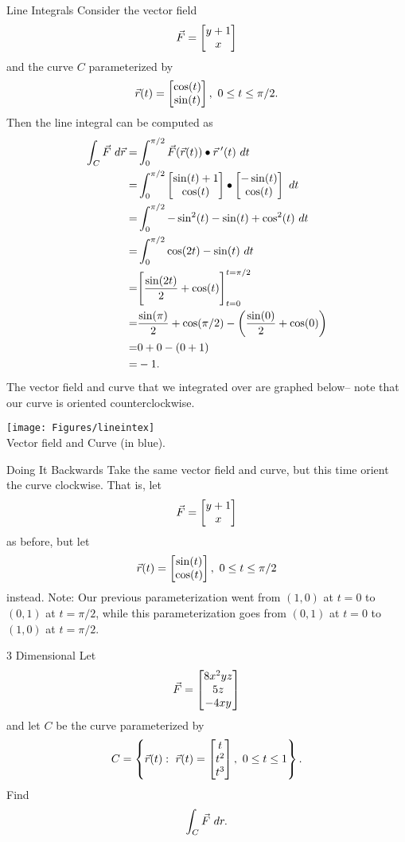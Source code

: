\begin{example}{\hypertarget{ftli}{Line Integrals}}
Consider the vector field $$\vec{F}=\begin{bmatrix}y+1\\x\end{bmatrix} $$ and the curve $C$ parameterized by $$\vec{r}(t)=\begin{bmatrix}\cos(t)\\ \sin(t)\end{bmatrix}, \ 0\leq t\leq\pi/2. $$
Then the line integral can be computed as 
\begin{align*}
\int_C \vcF \ d\vcr=&\int_{0}^{\pi/2}\vcF(\vcr(t))\bullet\vcr\vprime(t)\ dt\\
=&\int_{0}^{\pi/2}\bmat{\sin(t)+1\\ \cos(t)}\bullet\bmat{-\sin(t)\\\cos(t)}\ dt\\
=&\int_{0}^{\pi/2}-\sin^2(t)-\sin(t)+\cos^2(t)\ dt\\
=&\int_{0}^{\pi/2}\cos(2t)-\sin(t)\ dt\\
=&\Bigg[\frac{\sin(2t)}{2}+\cos(t)\Bigg]_{t=0}^{t=\pi/2}\\
=&\frac{\sin(\pi)}{2}+\cos(\pi/2)-\left(\frac{\sin(0)}{2}+\cos(0)\right)\\
=& 0+0-(0+1)\\
=&-1.
\end{align*}
The vector field and curve that we integrated over are graphed below-- note that our curve is oriented counterclockwise.
\vspace{1em}
\begin{center}
\texttt{[image: Figures/lineintex]}\\
Vector field and Curve (in blue).
\end{center}
\end{example}

\begin{exercise}{Doing It Backwards}
Take the same vector field and curve, but this time orient the curve clockwise. That is, let $$\vec{F}=\begin{bmatrix}y+1\\x\end{bmatrix} $$ as before, but let $$\vec{r}(t)=\begin{bmatrix}\sin(t)\\ \cos(t)\end{bmatrix}, \ 0\leq t\leq \pi/2$$ instead. Note: Our previous parameterization went from $(1,0)$ at $t=0$ to $(0,1)$ at $t=\pi/2$, while this parameterization goes from $(0,1)$ at $t=0$ to $(1,0)$ at $t=\pi/2$.
\end{exercise}

\begin{pexercise}{3 Dimensional}
Let $$\vec{F}=\begin{bmatrix}8x^2yz\\5z\\-4xy\end{bmatrix}$$ and let $C$ be the curve parameterized by $$C=\left\{\vcr(t):\ \vcr(t)=\bmat{t\\t^2\\t^3},\ 0\leq t\leq 1\right\}. $$ Find $$\int_C \vec{F} \ dr.$$
\end{pexercise}

